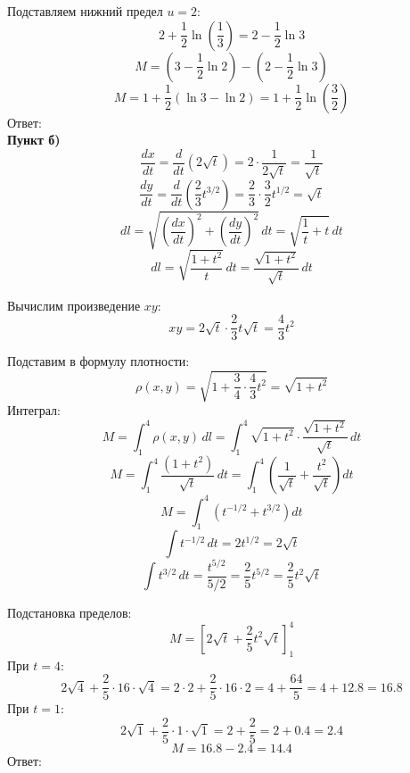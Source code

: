 \documentclass[12pt,fleqn]{article}
\begin{document}
\begin{flushleft}
    Подставляем нижний предел $u = 2$:
    \[
    2 + \frac{1}{2}\ln\left(\frac{1}{3}\right) = 2 - \frac{1}{2}\ln 3
    \]
    \[ M = \left(3 - \frac{1}{2}\ln 2\right) - \left(2 - \frac{1}{2}\ln 3\right) \]
    \[M = 1 + \frac{1}{2}(\ln 3 - \ln 2) = 1 + \frac{1}{2}\ln\left(\frac{3}{2}\right) \]
    Ответ:  \\

    \vspace{30pt}
    \textbf{Пункт б)}
    \[ \frac{dx}{dt} = \frac{d}{dt}(2\sqrt{t}) = 2 \cdot \frac{1}{2\sqrt{t}} = \frac{1}{\sqrt{t}}\]
    \[ \frac{dy}{dt} = \frac{d}{dt}\left(\frac{2}{3}t^{3/2}\right) = \frac{2}{3} \cdot \frac{3}{2}t^{1/2} = \sqrt{t} \]
    \[dl = \sqrt{\left(\frac{dx}{dt}\right)^2 + \left(\frac{dy}{dt}\right)^2} \, dt = \sqrt{\frac{1}{t} + t} \, dt\]
    \[dl = \sqrt{\frac{1 + t^2}{t}} \, dt = \frac{\sqrt{1 + t^2}}{\sqrt{t}} \, dt\]

    Вычислим произведение $xy$:
        \[xy = 2\sqrt{t} \cdot \frac{2}{3}t\sqrt{t} = \frac{4}{3}t^2\]

    Подставим в формулу плотности:
    \[\rho(x,y) = \sqrt{1 + \frac{3}{4} \cdot \frac{4}{3}t^2} = \sqrt{1 + t^2}\]
    Интеграл:
    \[M = \int_1^4 \rho(x,y) \, dl = \int_1^4 \sqrt{1 + t^2} \cdot \frac{\sqrt{1 + t^2}}{\sqrt{t}} \, dt\]
    \[M = \int_1^4 \frac{(1 + t^2)}{\sqrt{t}} \, dt = \int_1^4 \left(\frac{1}{\sqrt{t}} + \frac{t^2}{\sqrt{t}}\right) dt\]
    \[M = \int_1^4 \left(t^{-1/2} + t^{3/2}\right) dt\]
    \[\int t^{-1/2} \, dt = 2t^{1/2} = 2\sqrt{t}\]
    \[\int t^{3/2} \, dt = \frac{t^{5/2}}{5/2} = \frac{2}{5}t^{5/2} = \frac{2}{5}t^2\sqrt{t}\]

    Подстановка пределов:
    \[M = \left[2\sqrt{t} + \frac{2}{5}t^2\sqrt{t}\right]_1^4\]
    При $t = 4$:\[2\sqrt{4} + \frac{2}{5} \cdot 16 \cdot \sqrt{4} = 2 \cdot 2 + \frac{2}{5} \cdot 16 \cdot 2 = 4 + \frac{64}{5} = 4 + 12.8 = 16.8\]
    При $t = 1$:
    \[2\sqrt{1} + \frac{2}{5} \cdot 1 \cdot \sqrt{1} = 2 + \frac{2}{5} = 2 + 0.4 = 2.4\]
    \[M = 16.8 - 2.4 = 14.4\]
    Ответ:  \\
\end{flushleft}


\newpage
\end{document}

